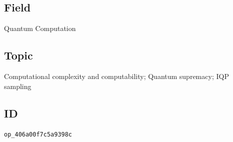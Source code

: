 \subsection*{Field}

Quantum Computation

\subsection*{Topic}

Computational complexity and computability; Quantum supremacy; IQP sampling

\subsection*{ID}

\texttt{op\_406a00f7c5a9398c}
